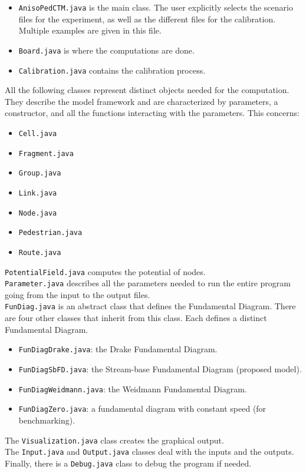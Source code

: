 \documentclass[a4paper,12pt]{article}
\begin{document}
\begin{itemize}
\item \verb+AnisoPedCTM.java+ is the main class. The user explicitly selects the scenario files for the experiment, as well as the different files for the calibration. Multiple examples are given in this file.
\item \verb+Board.java+ is where the computations are done.
\item \verb+Calibration.java+ contains the calibration process.
\end{itemize}
All the following classes represent distinct objects needed for the computation. They describe the model framework and are characterized by parameters, a constructor, and all the functions interacting with the parameters. This concerns: 
\begin{itemize}
\item \verb+Cell.java+
\item \verb+Fragment.java+
\item \verb+Group.java+
\item \verb+Link.java+
\item \verb+Node.java+
\item \verb+Pedestrian.java+
\item \verb+Route.java+
\end{itemize}
\verb+PotentialField.java+ computes the potential of nodes.\\
\newline
\verb+Parameter.java+ describes all the parameters needed to run the entire program going from the input to the output files. \\
\newline
\verb+FunDiag.java+ is an abstract class that defines the Fundamental Diagram. There are four other classes that inherit from this class. Each defines a distinct Fundamental Diagram.

\begin{itemize}
\item \verb+FunDiagDrake.java+: the Drake Fundamental Diagram.
\item \verb+FunDiagSbFD.java+: the Stream-base Fundamental Diagram (proposed model).
\item \verb+FunDiagWeidmann.java+: the Weidmann Fundamental Diagram.
\item \verb+FunDiagZero.java+: a fundamental diagram with constant speed (for benchmarking).
\end{itemize}
The \verb+Visualization.java+ class creates the graphical output.\\
\newline
The \verb+Input.java+ and \verb+Output.java+ classes deal with the inputs and the outputs.\\
 \newline
Finally, there is a \verb+Debug.java+ class to debug the program if needed.
\end{document}
